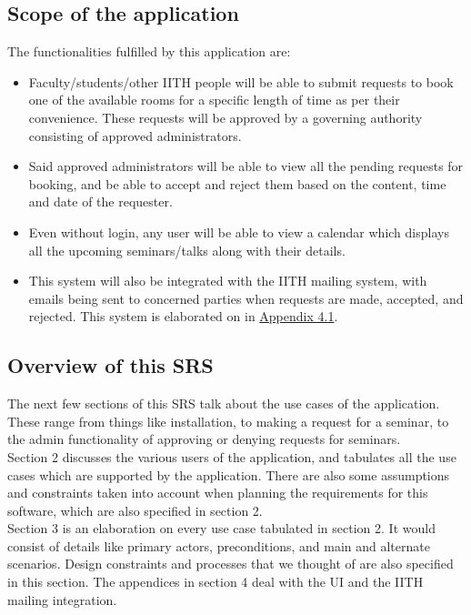 \documentclass{article}
\begin{document}
\subsection{Scope of the application}
The functionalities fulfilled by this application are: 
\begin{itemize}
    \item Faculty/students/other IITH people will be able to submit requests to book one of the available rooms for a specific length of time as per their convenience. These requests will be approved by a governing authority consisting of approved administrators. 
    \item Said approved administrators will be able to view all the pending requests for booking, and be able to accept and reject them based on the content, time and date of the requester. 
    \item Even without login, any user will be able to view a calendar which displays all the upcoming seminars/talks along with their details. 
    \item This system will also be integrated with the IITH mailing system, with emails being sent to concerned parties when requests are made, accepted, and rejected. This system is elaborated on in \hyperref[mail_appendix]{Appendix 4.1}.%
\end{itemize}

\subsection{Overview of this SRS}
The next few sections of this SRS talk about the use cases of the application. These range from things like installation, to making a request for a seminar, to the admin functionality of approving or denying requests for seminars. 
\\
Section 2 discusses the various users of the application, and tabulates all the use cases which are supported by the application. There are also some assumptions and constraints taken into account when planning the requirements for this software, which are also specified in section 2.
\\ 
Section 3 is an elaboration on every use case tabulated in section 2. It would consist of details like primary actors, preconditions, and main and alternate scenarios. Design constraints and processes that we thought of are also specified in this section. The appendices in section 4 deal with the UI and the IITH mailing integration.
\end{document}
